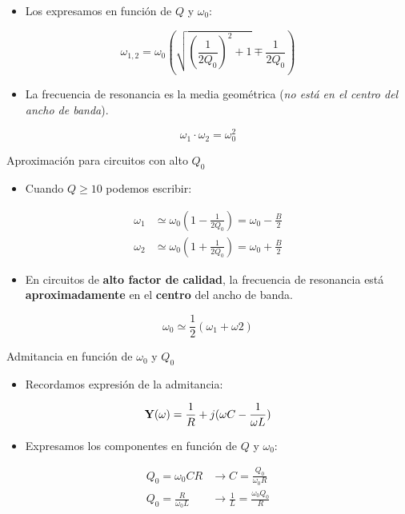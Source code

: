 \begin{itemize}
\item Los expresamos en función de \(Q\) y \(\omega_0\):
\end{itemize}

\[
\omega_{1,2}= \omega_0\left(\sqrt{\left(\frac{1}{2Q_0}\right)^2 + 1} \mp \frac{1}{2Q_0}\right)
\]

\begin{itemize}
\item La frecuencia de resonancia es la media geométrica (\emph{no está en el centro del ancho de banda}).
\end{itemize}
\[
  \boxed{\omega_1 \cdot \omega_2 = \omega_0^2} 
\]

{Aproximación para circuitos con alto \(Q_0\)}

\begin{itemize}
\item Cuando \(Q \geq 10\) podemos escribir:
\end{itemize}
\begin{align*}
\omega_1 &\simeq \omega_0\left(1 - \frac{1}{2Q_0}\right) = \omega_0 - \frac{B}{2}\\
\omega_2 &\simeq \omega_0\left(1 + \frac{1}{2Q_0}\right) = \omega_0 + \frac{B}{2}
\end{align*}

\begin{itemize}
\item En circuitos de \textbf{alto factor de calidad}, la frecuencia de resonancia está \textbf{aproximadamente} en el \textbf{centro} del ancho de banda.
\end{itemize}

\[
  \boxed{\omega_0 \simeq \frac{1}{2}(\omega_1 + \omega2)}
\]

{Admitancia en función de \(\omega_0\) y \(Q_0\)}

\begin{itemize}
\item Recordamos expresión de la admitancia:
\end{itemize}

\[
  \mathbf{Y}(\omega) = \frac{1}{R} + j(\omega C - \frac{1}{\omega L})
\]
\begin{itemize}
\item Expresamos los componentes en función de \(Q\) y \(\omega_0\):
\end{itemize}
\begin{align*}
  Q_0 = \omega_0 C R &\rightarrow C = \frac{Q_0}{\omega_0 R}\\
  Q_0 = \frac{R}{\omega_0 L} &\rightarrow \frac{1}{L} = \frac{\omega_0 Q_0}{R}
\end{align*}

